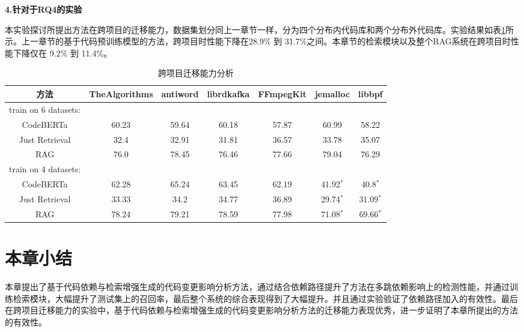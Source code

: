 \textbf{4.针对于RQ4的实验}

本实验探讨所提出方法在跨项目的迁移能力，数据集划分同上一章节一样，分为四个分布内代码库和两个分布外代码库。实验结果如表\ref{2_跨项目迁移能力分析}所示。上一章节的基于代码预训练模型的方法，跨项目时性能下降在28.9\% 到 31.7\%之间。本章节的检索模块以及整个RAG系统在跨项目时性能下降仅在 9.2\% 到 11.4\%。


\begin{table}[htbp]
\caption{跨项目迁移能力分析}
\label{2_跨项目迁移能力分析}
\vspace{0.5em}\centering\wuhao
\begin{tabular}{c|cccc|cc}
\toprule
方法& TheAlgorithms & antiword & librdkafka & FFmpegKit & jemalloc & libbpf\\
\midrule
train on 6 datasets:\\
\midrule
CodeBERTa  &  60.23 & 59.64 & 60.18 & 57.87 & 60.99 & 58.22 \\
Just Retrieval   & 32.4 & 32.91 & 31.81 & 36.57 & 33.78 & 35.07  \\
RAG & 76.0 & 78.45 & 76.46 & 77.66 & 79.04 & 76.29  \\
\midrule
train on 4 datasets:\\
\midrule
CodeBERTa  &  62.28 & 65.24 & 63.45 & 62.19 & 41.92$^*$ & 40.8$^*$\\
Just Retrieval   & 33.33 & 34.2 & 34.77 & 36.89 & 29.74$^*$ & 31.09$^*$ \\
RAG & 78.24 & 79.21 & 78.59 & 77.98 & 71.08$^*$ & 69.66$^*$ \\
\bottomrule
\end{tabular}
\end{table}
 

\section{本章小结}

本章提出了基于代码依赖与检索增强生成的代码变更影响分析方法，通过结合依赖路径提升了方法在多跳依赖影响上的检测性能，并通过训练检索模块，大幅提升了测试集上的召回率，最后整个系统的综合表现得到了大幅提升。并且通过实验验证了依赖路径加入的有效性。最后在跨项目迁移能力的实验中，基于代码依赖与检索增强生成的代码变更影响分析方法的迁移能力表现优秀，进一步证明了本章所提出的方法的有效性。

